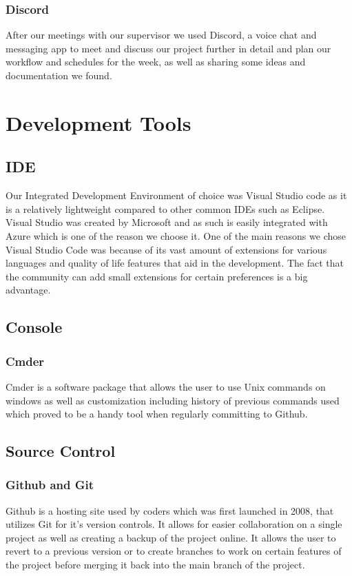  \subsubsection{Discord}
 After our meetings with our supervisor we used Discord, a voice chat and messaging app to meet and discuss our project further in detail and plan our workflow and schedules for the week, as well as sharing some ideas and documentation we found.
 
 \section{Development Tools}
 \subsection{IDE}
 Our Integrated Development Environment of choice was Visual Studio code as it is a relatively lightweight compared to other common IDEs such as Eclipse. Visual Studio was created by Microsoft and as such is easily integrated with Azure which is one of the reason we choose it. One of the main reasons we chose Visual Studio Code was because of its vast amount of extensions for various languages and quality of life features that aid in the development. The fact that the community can add small extensions for certain preferences  is a big advantage.
 
 \subsection{Console}
 \subsubsection{Cmder}
 Cmder is a software package that allows the user to use Unix commands on windows as well as customization including history of previous commands used which proved to be a handy tool when regularly committing to Github.
 
 \subsection{Source Control}
 \subsubsection{Github and Git}
 Github is a hosting site used by coders which was first launched in 2008, that utilizes Git for it's version controls. It allows for easier collaboration on a single project as well as creating a backup of the project online. It allows the user to revert to a previous version or to create branches to work on certain features of the project before merging it back into the main branch of the project.
 
